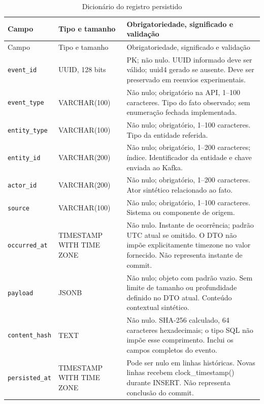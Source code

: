 {\small
\begin{longtable}{>{\raggedright\arraybackslash}p{}>{\raggedright\arraybackslash}p{}>{\raggedright\arraybackslash}p{}}
\caption{Dicionário do registro persistido}\label{tab:dic-audit}\\
\hline Campo & Tipo e tamanho & Obrigatoriedade, significado e validação\\ \hline
\endfirsthead
\hline Campo & Tipo e tamanho & Obrigatoriedade, significado e validação\\ \hline
\endhead
\texttt{event\_id} & UUID, 128 bits & PK; não nulo. UUID informado deve ser válido; uuid4 gerado se ausente. Deve ser preservado em reenvios experimentais.\\ \hline
\texttt{event\_type} & VARCHAR(100) & Não nulo; obrigatório na API, 1--100 caracteres. Tipo do fato observado; sem enumeração fechada implementada.\\ \hline
\texttt{entity\_type} & VARCHAR(100) & Não nulo; obrigatório, 1--100 caracteres. Tipo da entidade referida.\\ \hline
\texttt{entity\_id} & VARCHAR(200) & Não nulo; obrigatório, 1--200 caracteres; índice. Identificador da entidade e chave enviada ao Kafka.\\ \hline
\texttt{actor\_id} & VARCHAR(200) & Não nulo; obrigatório, 1--200 caracteres. Ator sintético relacionado ao fato.\\ \hline
\texttt{source} & VARCHAR(100) & Não nulo; obrigatório, 1--100 caracteres. Sistema ou componente de origem.\\ \hline
\texttt{occurred\_at} & TIMESTAMP WITH TIME ZONE & Não nulo. Instante de ocorrência; padrão UTC atual se omitido. O DTO não impõe explicitamente timezone no valor fornecido. Não representa instante de commit.\\ \hline
\texttt{payload} & JSONB & Não nulo; objeto com padrão vazio. Sem limite de tamanho ou profundidade definido no DTO atual. Conteúdo contextual sintético.\\ \hline
\texttt{content\_hash} & TEXT & Não nulo. SHA-256 calculado, 64 caracteres hexadecimais; o tipo SQL não impõe esse comprimento. Inclui os campos completos do evento.\\ \hline
\texttt{persisted\_at} & TIMESTAMP WITH TIME ZONE & Pode ser nulo em linhas históricas. Novas linhas recebem clock\_timestamp() durante INSERT. Não representa conclusão do commit.\\ \hline
\end{longtable}
\par
}

